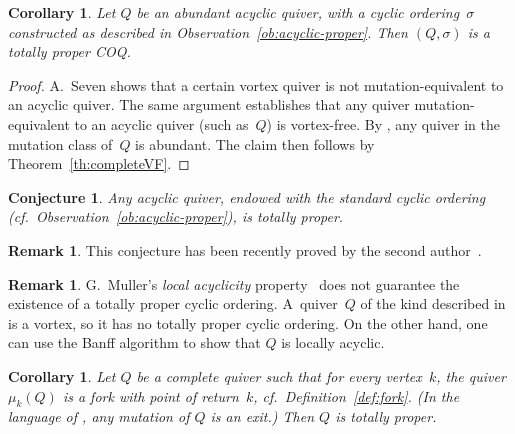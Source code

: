 \documentclass[11pt, letterpaper]{amsart}
\newtheorem{conjecture}[theorem]{Conjecture}
\newtheorem{corollary}[theorem]{Corollary}
\theoremstyle{definition}
\newtheorem{remark}[theorem]{Remark}
\numberwithin{equation}{section}
\begin{document}
\begin{corollary}
\label{cor:abundant-acyclic-proper}
Let $Q$ be an abundant acyclic quiver, with a cyclic ordering~$\sigma$ 
constructed as described in Observation~\ref{ob:acyclic-proper}.
Then  $(Q,\sigma)$ is a totally proper COQ. 
\end{corollary}

\begin{proof}
A.~Seven \cite[p.~473]{SevenAMatrices} shows that a certain vortex quiver is not mutation-equi\-valent to an acyclic quiver. 
The same argument establishes that any quiver mutation-equivalent to an acyclic quiver 
(such as~$Q$) is vortex-free.
By \cite[Section~6]{LMC}, any quiver in the mutation class of~$Q$ is abundant.
The claim then follows by Theorem~\ref{th:completeVF}. 
\end{proof}

\begin{conjecture}
Any acyclic quiver, endowed with the standard cyclic ordering (cf.\ Observation~\ref{ob:acyclic-proper}), 
is totally proper. 
\end{conjecture}

\begin{remark}
\label{rem:atp}
This conjecture has been recently proved by the second author~\cite{SN-acyclic-TP}. 
\end{remark}

\begin{remark}
G.~Muller's \emph{local acyclicity} property~\cite{Muller-loc-acyclic}
does not guarantee the existence of a totally proper cyclic ordering. 
A~quiver~$Q$ of the kind described in \cite[Figure~1]{LMC} is a vortex, 
so it has no totally proper cyclic ordering. 
On the other hand, one can use the Banff algorithm \cite[Theorem~5.5]{Muller-loc-acyclic} 
to show that $Q$ is locally acyclic.  
\end{remark}

\begin{corollary}
\label{cor:minimal cyclic totally proper eg}
Let $Q$ be a complete quiver such that for every vertex~$k$, the quiver $\mu_k(Q)$ is a fork with point of return~$k$,
cf.\ Definition~\ref{def:fork}. 
(In the language of \cite[Section~6]{LMC}, any mutation of $Q$ is an \emph{exit}.)
Then $Q$ is totally proper.
\end{corollary}
\end{document}

